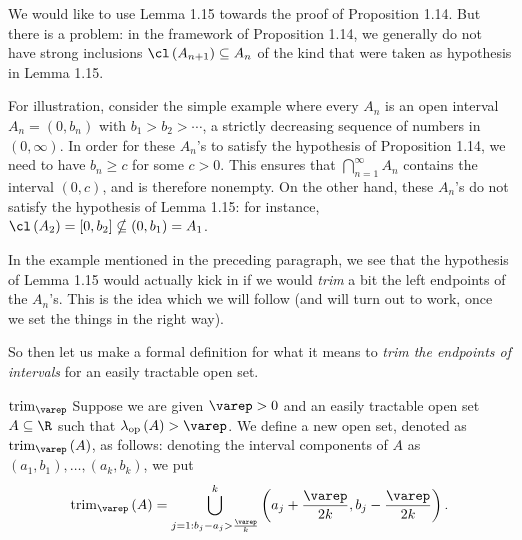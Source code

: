 \documentclass[pmath450]{subfiles}
\begin{document}
    \np We would like to use Lemma 1.15 towards the proof of Proposition 1.14. But there is a problem: in the framework of Proposition 1.14, we generally do not have strong inclusions $\cl\left( A_{n+1} \right)\subseteq A_n$ of the kind that were taken as hypothesis in Lemma 1.15.

    For illustration, consider the simple example where every $A_n$ is an open interval $A_n=\left( 0,b_n \right)$ with $b_1>b_2>\cdots$, a strictly decreasing sequence of numbers in $\left( 0,\infty \right)$. In order for these $A_n$'s to satisfy the hypothesis of Proposition 1.14, we need to have $b_n\geq c$ for some $c>0$. This ensures that $\bigcap^{\infty}_{n=1}A_n$ contains the interval $\left( 0,c \right)$, and is therefore nonempty. On the other hand, these $A_n$'s do not satisfy the hypothesis of Lemma 1.15: for instance, $\cl\left( A_2 \right)=\left[ 0,b_2 \right]\nsubseteq\left( 0,b_1 \right)=A_1$.

    In the example mentioned in the preceding paragraph, we see that the hypothesis of Lemma 1.15 would actually kick in if we would \textit{trim} a bit the left endpoints of the $A_n$'s. This is the idea which we will follow (and will turn out to work, once we set the things in the right way).

    So then let us make a formal definition for what it means to \textit{trim the endpoints of intervals} for an easily tractable open set.

    \begin{notation}{$\trim_{\varep}$}
        Suppose we are given $\varep>0$ and an easily tractable open set $A\subseteq\R$ such that $\lambda_{\op}\left( A \right)>\varep$. We define a new open set, denoted as $\trim_{\varep}\left( A \right)$, as follows: denoting the interval components of $A$ as $\left( a_1,b_1 \right),\ldots,\left( a_k,b_k \right)$, we put
        \begin{equation}
            \trim_{\varep}\left( A \right) = \bigcup^{k}_{j=1: b_j-a_j>\frac{\varep}{k}} \left( a_j+\frac{\varep}{2k},b_j-\frac{\varep}{2k} \right).
        \end{equation}
    \end{notation}
\end{document}
